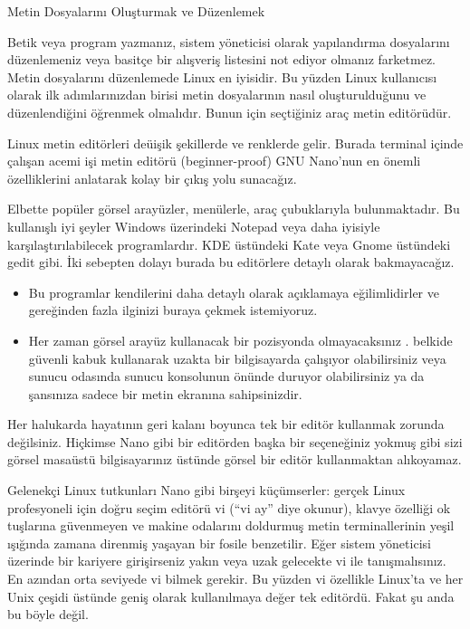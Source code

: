 \begin{section}{Metin Dosyalarını Oluşturmak ve Düzenlemek}

Betik veya program yazmanız, sistem yöneticisi olarak yapılandırma dosyalarını düzenlemeniz veya basitçe bir alışveriş listesini not ediyor olmanız farketmez. Metin dosyalarını düzenlemede Linux en iyisidir. Bu yüzden Linux kullanıcısı olarak ilk adımlarınızdan birisi metin dosyalarının nasıl oluşturulduğunu ve düzenlendiğini öğrenmek olmalıdır. Bunun için seçtiğiniz araç metin editörüdür. 

Linux metin editörleri deüişik şekillerde ve renklerde gelir. Burada terminal içinde çalışan acemi işi metin editörü (beginner-proof) GNU Nano’nun en önemli özelliklerini anlatarak kolay bir çıkış yolu sunacağız.

Elbette popüler görsel arayüzler, menülerle, araç çubuklarıyla bulunmaktadır. Bu kullanışlı iyi şeyler Windows üzerindeki Notepad veya daha iyisiyle karşılaştırılabilecek programlardır. KDE üstündeki Kate veya Gnome üstündeki gedit gibi. İki sebepten dolayı  burada bu editörlere detaylı olarak bakmayacağız.

\begin{itemize}
\item Bu programlar kendilerini daha detaylı olarak açıklamaya eğilimlidirler ve gereğinden fazla ilginizi buraya çekmek istemiyoruz. 
\item Her zaman görsel arayüz kullanacak bir pozisyonda olmayacaksınız . belkide güvenli kabuk kullanarak uzakta bir bilgisayarda çalışıyor olabilirsiniz veya sunucu odasında sunucu konsolunun önünde duruyor olabilirsiniz ya da şansınıza sadece bir metin ekranına sahipsinizdir. 
\end{itemize}

Her halukarda hayatının geri kalanı boyunca tek bir editör kullanmak zorunda değilsiniz. Hiçkimse Nano gibi bir editörden başka bir seçeneğiniz yokmuş gibi sizi görsel masaüstü bilgisayarınız üstünde görsel bir editör kullanmaktan alıkoyamaz.
 
Gelenekçi Linux tutkunları Nano gibi birşeyi küçümserler: gerçek Linux profesyoneli için doğru seçim editörü vi (“vi ay” diye okunur), klavye özelliği ok tuşlarına güvenmeyen ve makine odalarını doldurmuş metin terminallerinin yeşil ışığında zamana direnmiş yaşayan bir fosile benzetilir. Eğer sistem yöneticisi üzerinde bir kariyere girişirseniz yakın veya uzak gelecekte vi ile tanışmalısınız. En azından orta seviyede vi bilmek gerekir. Bu yüzden vi özellikle Linux’ta ve her Unix çeşidi üstünde geniş olarak kullanılmaya değer tek editördü. Fakat şu anda bu böyle değil. 


\end{section}
